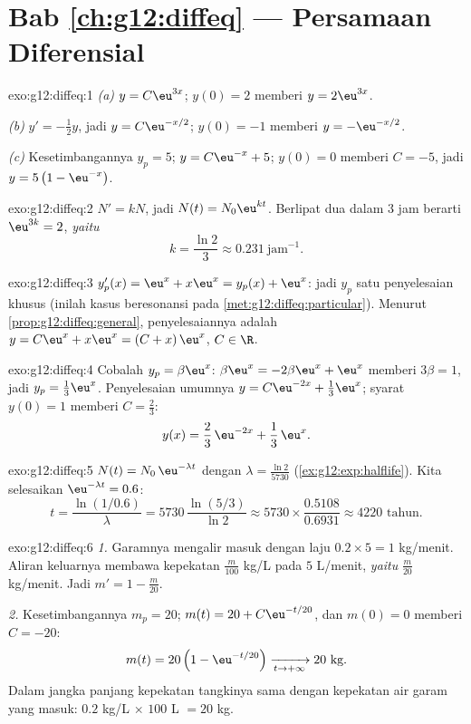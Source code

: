 \section*{Bab \ref{ch:g12:diffeq} --- Persamaan Diferensial}

\begin{solution}{exo:g12:diffeq:1}
\emph{(a)} $y = C\eu^{3x}$; $y(0) = 2$ memberi $y = 2\eu^{3x}$.

\emph{(b)} $y' = -\frac12 y$, jadi $y = C\eu^{-x/2}$; $y(0) = -1$ memberi
$y = -\eu^{-x/2}$.

\emph{(c)} Kesetimbangannya $y_p = 5$; $y = C\eu^{-x} + 5$; $y(0) = 0$ memberi
$C = -5$, jadi $y = 5\left(1 - \eu^{-x}\right)$.
\end{solution}

\begin{solution}{exo:g12:diffeq:2}
$N' = kN$, jadi $N(t) = N_0 \eu^{kt}$. Berlipat dua dalam $3$ jam berarti
$\eu^{3k} = 2$, \emph{yaitu}
\[
k = \frac{\ln 2}{3} \approx 0.231\ \text{jam}^{-1}.
\]
\end{solution}

\begin{solution}{exo:g12:diffeq:3}
$y_p'(x) = \eu^x + x\eu^x = y_p(x) + \eu^x$: jadi $y_p$ satu penyelesaian khusus
(inilah kasus beresonansi pada \cref{met:g12:diffeq:particular}). Menurut
\cref{prop:g12:diffeq:general}, penyelesaiannya adalah
$y = C\eu^{x} + x\eu^{x} = (C + x)\,\eu^x$, $C \in \R$.
\end{solution}

\begin{solution}{exo:g12:diffeq:4}
Cobalah $y_p = \beta\eu^x$: $\beta\eu^x = -2\beta\eu^x + \eu^x$ memberi
$3\beta = 1$, jadi $y_p = \frac13\eu^x$. Penyelesaian umumnya
$y = C\eu^{-2x} + \frac13\eu^{x}$; syarat $y(0) = 1$ memberi
$C = \frac23$:
\[
y(x) = \frac{2}{3}\,\eu^{-2x} + \frac{1}{3}\,\eu^{x}.
\]
\end{solution}

\begin{solution}{exo:g12:diffeq:5}
$N(t) = N_0\,\eu^{-\lambda t}$ dengan $\lambda = \frac{\ln 2}{5730}$
(\cref{ex:g12:exp:halflife}). Kita selesaikan $\eu^{-\lambda t} = 0.6$:
\[
t = \frac{\ln(1/0.6)}{\lambda} = 5730\,\frac{\ln(5/3)}{\ln 2}
\approx 5730 \times \frac{0.5108}{0.6931} \approx 4220 \text{ tahun}.
\]
\end{solution}

\begin{solution}{exo:g12:diffeq:6}
\emph{1.} Garamnya mengalir masuk dengan laju $0.2 \times 5 = 1$ kg/menit. Aliran
keluarnya membawa kepekatan $\frac{m}{100}$ kg/L pada $5$ L/menit, \emph{yaitu}
$\frac{m}{20}$ kg/menit. Jadi $m' = 1 - \frac{m}{20}$.

\emph{2.} Kesetimbangannya $m_p = 20$; $m(t) = 20 + C\eu^{-t/20}$, dan
$m(0) = 0$ memberi $C = -20$:
\[
m(t) = 20\left(1 - \eu^{-t/20}\right) \xrightarrow[t\to+\infty]{} 20 \text{ kg}.
\]
Dalam jangka panjang kepekatan tangkinya sama dengan kepekatan air garam yang
masuk: $0.2$ kg/L $\times$ $100$ L $= 20$ kg.
\end{solution}

